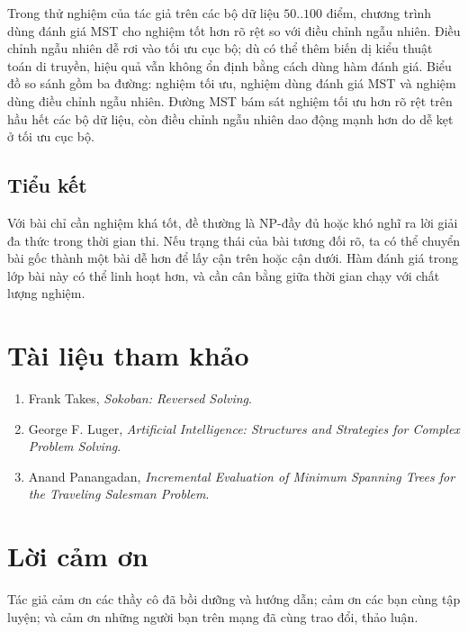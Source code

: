 \documentclass[11pt]{article}
\begin{document}
Trong thử nghiệm của tác giả trên các bộ dữ liệu \(50..100\) điểm, chương
trình dùng đánh giá MST cho nghiệm tốt hơn rõ rệt so với điều chỉnh ngẫu nhiên.
Điều chỉnh ngẫu nhiên dễ rơi vào tối ưu cục bộ; dù có thể thêm biến dị kiểu
thuật toán di truyền, hiệu quả vẫn không ổn định bằng cách dùng hàm đánh giá.
Biểu đồ so sánh gồm ba đường: nghiệm tối ưu, nghiệm dùng đánh giá MST và nghiệm
dùng điều chỉnh ngẫu nhiên. Đường MST bám sát nghiệm tối ưu hơn rõ rệt trên hầu
hết các bộ dữ liệu, còn điều chỉnh ngẫu nhiên dao động mạnh hơn do dễ kẹt ở tối
ưu cục bộ.

\subsection{Tiểu kết}

Với bài chỉ cần nghiệm khá tốt, đề thường là NP-đầy đủ hoặc khó nghĩ ra lời
giải đa thức trong thời gian thi. Nếu trạng thái của bài tương đối rõ, ta có
thể chuyển bài gốc thành một bài dễ hơn để lấy cận trên hoặc cận dưới. Hàm
đánh giá trong lớp bài này có thể linh hoạt hơn, và cần cân bằng giữa thời
gian chạy với chất lượng nghiệm.

\section*{Tài liệu tham khảo}

\begin{enumerate}
  \item Frank Takes, \textit{Sokoban: Reversed Solving}.
  \item George F. Luger, \textit{Artificial Intelligence: Structures and
  Strategies for Complex Problem Solving}.
  \item Anand Panangadan, \textit{Incremental Evaluation of Minimum Spanning
  Trees for the Traveling Salesman Problem}.
\end{enumerate}

\section*{Lời cảm ơn}

Tác giả cảm ơn các thầy cô đã bồi dưỡng và hướng dẫn; cảm ơn các bạn cùng tập
luyện; và cảm ơn những người bạn trên mạng đã cùng trao đổi, thảo luận.
\end{document}
